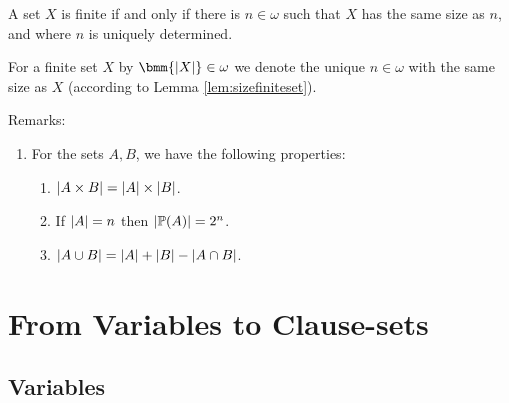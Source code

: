 \documentclass[12pt]{book}
\begin{document}
\begin{lem}\label{lem:sizefiniteset}
  A set $X$ is finite if and only if there is $n \in \omega$ such that $X$ has the same size as $n$, and where $n$ is uniquely determined.
\end{lem}

\begin{defi}\label{def:sizefiniteset}
  For a finite set $X$ by $\bmm{\abs{X}} \in \omega$ we denote the unique $n \in \omega$ with the same size as $X$ (according to Lemma \ref{lem:sizefiniteset}).
\end{defi}
Remarks:
\begin{enumerate}
  \item For the sets $A , B$, we have the following properties:
   \begin{enumerate}
     \item $\lvert A \times B  \rvert= \lvert A \rvert \times \lvert B \rvert$.
	 \item If $\lvert A \rvert = n$ then $\lvert \operatorname{\mathbb{P}}(A) \rvert = 2^n$.
	 \item $\lvert A \cup B \rvert = \lvert A \rvert + \lvert B \rvert - \lvert A \cap B \rvert$.
   \end{enumerate} 
 \end{enumerate}


\chapter{From Variables to Clause-sets}
\label{cha:vartocls}

\section{Variables}
\label{sec:Variables}
\end{document}
